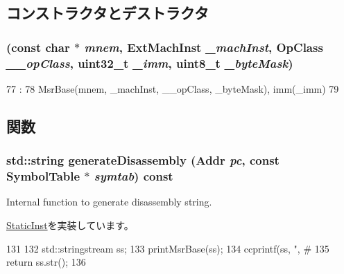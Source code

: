 \subsection{コンストラクタとデストラクタ}
\hypertarget{classMsrImmOp_acdabee2e3e1f777fe4e73ce9decacb69}{
\subsubsection[{MsrImmOp}]{ (const char $\ast$ {\em mnem}, \/  {\bf ExtMachInst} {\em \_\-machInst}, \/  OpClass {\em \_\-\_\-opClass}, \/  {\bf uint32\_\-t} {\em \_\-imm}, \/  uint8\_\-t {\em \_\-byteMask})}}
\label{classMsrImmOp_acdabee2e3e1f777fe4e73ce9decacb69}



\begin{DoxyCode}
77                                                :
78         MsrBase(mnem, _machInst, __opClass, _byteMask), imm(_imm)
79     {}

\end{DoxyCode}


\subsection{関数}
\hypertarget{classMsrImmOp_a95d323a22a5f07e14d6b4c9385a91896}{
\subsubsection[{generateDisassembly}]{\setlength{\rightskip}{0pt plus 5cm}std::string generateDisassembly ({\bf Addr} {\em pc}, \/  const SymbolTable $\ast$ {\em symtab}) const}}
\label{classMsrImmOp_a95d323a22a5f07e14d6b4c9385a91896}
Internal function to generate disassembly string. 

\hyperlink{classStaticInst_ab4a569d2623620c04f8a52bbd91d63b9}{StaticInst}を実装しています。


\begin{DoxyCode}
131 {
132     std::stringstream ss;
133     printMsrBase(ss);
134     ccprintf(ss, ", #%
135     return ss.str();
136 }
\end{DoxyCode}


